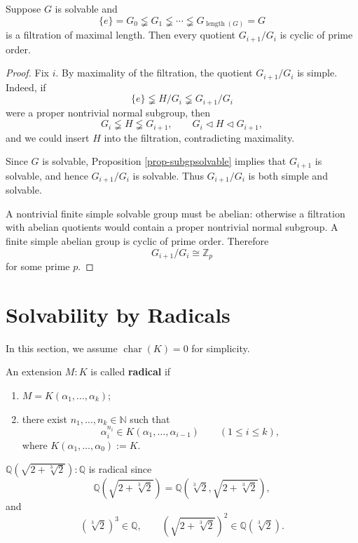 \begin{proposition}\label{prop-maximalFiltrationCyclicGroups}
    Suppose $G$ is solvable and
    \[
    \{e\}=G_0\lneqq G_1\lneqq\cdots\lneqq
    G_{\operatorname{length}(G)}=G
    \]
    is a filtration of maximal length. Then every quotient $G_{i+1}/G_i$ is cyclic of prime order.
\end{proposition}

\begin{proof}
    Fix $i$. By maximality of the filtration, the quotient $G_{i+1}/G_i$ is simple. Indeed, if
    \[
    \{e\}\lneqq H/G_i\lneqq G_{i+1}/G_i
    \]
    were a proper nontrivial normal subgroup, then
    \[
    G_i\lneqq H\lneqq G_{i+1},
    \qquad
    G_i\lhd H\lhd G_{i+1},
    \]
    and we could insert $H$ into the filtration, contradicting maximality.

    Since $G$ is solvable, Proposition \ref{prop-subgpsolvable} implies that $G_{i+1}$ is solvable, and hence
    $G_{i+1}/G_i$ is solvable. Thus $G_{i+1}/G_i$ is both simple and solvable.

    A nontrivial finite simple solvable group must be abelian: otherwise a filtration with abelian quotients would contain a proper nontrivial normal subgroup. A finite simple abelian group is cyclic of prime order. Therefore
    \[
    G_{i+1}/G_i\cong\mathbb Z_p
    \]
    for some prime $p$.
\end{proof}

\section{Solvability by Radicals}

In this section, we assume $\operatorname{char}(K)=0$ for simplicity.

\begin{definition}\label{def-radical}
    An extension $M:K$ is called {\bf radical} if
    \begin{enumerate}
        \item $M=K(\alpha_1,\dots,\alpha_k)$;
        \item there exist $n_1,\dots,n_k\in\mathbb N$ such that
        \[
        \alpha_i^{n_i}\in K(\alpha_1,\dots,\alpha_{i-1})
        \qquad (1\leq i\leq k),
        \]
        where $K(\alpha_1,\dots,\alpha_0):=K$.
    \end{enumerate}
\end{definition}

\begin{example}
    $\mathbb Q(\sqrt{2+\sqrt[3]{2}}):\mathbb Q$ is radical since
    \[
    \mathbb Q(\sqrt{2+\sqrt[3]{2}})
    =\mathbb Q(\sqrt[3]{2},\sqrt{2+\sqrt[3]{2}}),
    \]
    and
    \[
    (\sqrt[3]{2})^3\in\mathbb Q,
    \qquad
    (\sqrt{2+\sqrt[3]{2}})^2\in\mathbb Q(\sqrt[3]{2}).
    \]
\end{example}

